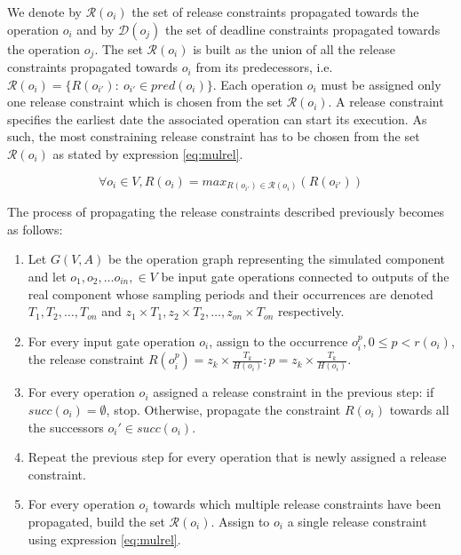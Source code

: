 We denote by $\mathcal{R}(o_i)$ the set of release constraints propagated towards the operation $o_i$ and by $\mathcal{D}(o_j)$ the set of deadline constraints propagated towards the operation $o_j$. The set $\mathcal{R}(o_i)$ is built as the union of all the release constraints propagated towards $o_i$ from its predecessors, i.e. $\mathcal{R}(o_i) = \{R(o_{i'}):\ o_{i'} \in pred(o_i)\}$. Each operation $o_i$ must be assigned only one release constraint which is chosen from the set $\mathcal{R}(o_i)$. A release constraint specifies the earliest date the associated operation can start its execution. As such, the most constraining release constraint has to be chosen from the set $\mathcal{R}(o_i)$ as stated by expression \ref{eq:mulrel}.

\begin{equation}
\forall o_i \in V, R(o_i) = max_{R(o_{i'}) \in \mathcal{R}(o_i)}(R(o_{i'}))
\label{eq:mulrel}
\end{equation}

The process of propagating the release constraints described previously becomes as follows:

\begin{enumerate}
\item Let $G(V,A)$ be the operation graph representing the simulated component and let $o_{1}, o_{2}, \ldots o_{in},\in  V$ be input gate operations connected to outputs of the real component whose sampling periods and their occurrences are denoted $T_{1}, T_{2}, \ldots, T_{on}$ and $z_1 \times T_1, z_2 \times T_2, \ldots, z_{on} \times T_{on}$ respectively.
\item For every input gate operation $o_{i}$, assign to the occurrence $o_{i}^{p}, 0 \leq p < r(o_{i})$, the release constraint $R(o_{i}^{p}) = z_k \times \frac{T_k}{H(o_{i})}: p = z_k \times \frac{T_{k}}{H(o_{i})}$.
\item For every operation $o_i$ assigned a release constraint in the previous step: if $succ(o_i) = \emptyset$, stop. Otherwise, propagate the constraint $R(o_i)$ towards all the successors $o_i' \in succ(o_i)$.
\item Repeat the previous step for every operation that is newly assigned a release constraint.
\item For every operation $o_i$ towards which multiple release constraints have been propagated, build the set $\mathcal{R}(o_i)$. Assign to $o_i$ a single release constraint using expression \ref{eq:mulrel}.
\end{enumerate}

